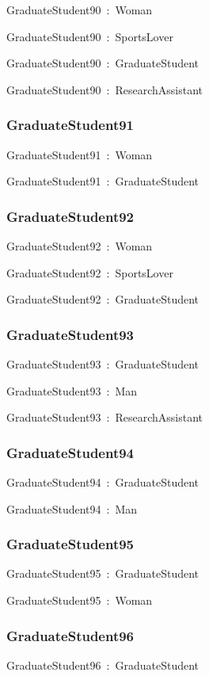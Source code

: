\documentclass{article}
\begin{document}
GraduateStudent90~:~Woman

GraduateStudent90~:~SportsLover

GraduateStudent90~:~GraduateStudent

GraduateStudent90~:~ResearchAssistant

\subsubsection*{GraduateStudent91}

GraduateStudent91~:~Woman

GraduateStudent91~:~GraduateStudent

\subsubsection*{GraduateStudent92}

GraduateStudent92~:~Woman

GraduateStudent92~:~SportsLover

GraduateStudent92~:~GraduateStudent

\subsubsection*{GraduateStudent93}

GraduateStudent93~:~GraduateStudent

GraduateStudent93~:~Man

GraduateStudent93~:~ResearchAssistant

\subsubsection*{GraduateStudent94}

GraduateStudent94~:~GraduateStudent

GraduateStudent94~:~Man

\subsubsection*{GraduateStudent95}

GraduateStudent95~:~GraduateStudent

GraduateStudent95~:~Woman

\subsubsection*{GraduateStudent96}

GraduateStudent96~:~GraduateStudent
\end{document}
